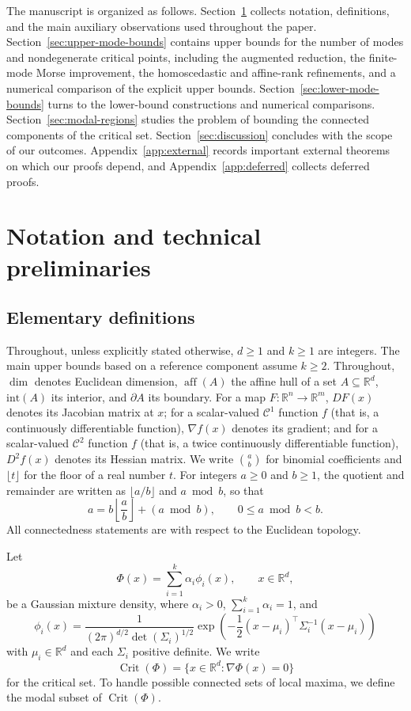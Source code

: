 \documentclass[11pt]{article}
\theoremstyle{plain}
\theoremstyle{definition}
\theoremstyle{remark}
\numberwithin{equation}{section}
\DeclareMathOperator{\aff}{aff}
\DeclareMathOperator{\Crit}{Crit}
\newcommand{\R}{\mathbb{R}}
\begin{document}
The manuscript is organized as follows. Section~\ref{sec:prelim} collects notation, definitions, and the main auxiliary observations used throughout the paper. Section~\ref{sec:upper-mode-bounds} contains upper bounds for the number of modes and nondegenerate critical points, including the augmented reduction, the finite-mode Morse improvement, the homoscedastic and affine-rank refinements, and a numerical comparison of the explicit upper bounds. Section~\ref{sec:lower-mode-bounds} turns to the lower-bound constructions and numerical comparisons. Section~\ref{sec:modal-regions} studies the problem of bounding the connected components of the critical set. Section~\ref{sec:discussion} concludes with the scope of our outcomes. Appendix~\ref{app:external} records important external theorems on which our proofs depend, and Appendix~\ref{app:deferred} collects deferred proofs.
\section{Notation and technical preliminaries}\label{sec:prelim}

\subsection{Elementary definitions}\label{subsec:definitions}

Throughout, unless explicitly stated otherwise, $d\ge1$ and $k\ge1$ are integers. The main upper bounds based on a reference component assume $k\ge2$. Throughout, $\dim$ denotes Euclidean dimension, $\aff(A)$ the affine hull of a set $A\subseteq\R^d$, $\mathrm{int}(A)$ its interior, and $\partial A$ its boundary. For a map $F:\R^n\to\R^m$, $DF(x)$ denotes its Jacobian matrix at $x$; for a scalar-valued $\mathcal{C}^1$ function $f$ (that is, a continuously differentiable function), $\nabla f(x)$ denotes its gradient; and for a scalar-valued $\mathcal{C}^2$ function $f$ (that is, a twice continuously differentiable function), $D^2f(x)$ denotes its Hessian matrix. We write $\binom{a}{b}$ for binomial coefficients and $\lfloor t\rfloor$ for the floor of a real number $t$. For integers $a\ge 0$ and $b\ge 1$, the quotient and remainder are written as $\lfloor a/b\rfloor$ and $a\bmod b$, so that
\[
a=b\left\lfloor\frac{a}{b}\right\rfloor +(a\bmod b),
\qquad
0\le a\bmod b<b.
\]
All connectedness statements are with respect to the Euclidean topology.

Let
\[
\Phi(x)=\sum_{i=1}^k \alpha_i\phi_i(x), \qquad x\in \R^d,
\]
be a Gaussian mixture density, where $\alpha_i>0$, $\sum_{i=1}^k \alpha_i=1$, and
\[
\phi_i(x)=\frac{1}{(2\pi)^{d/2}\det(\Sigma_i)^{1/2}}
\exp\!\left(-\frac12(x-\mu_i)^\top\Sigma_i^{-1}(x-\mu_i)\right)
\]
with $\mu_i\in\R^d$ and each $\Sigma_i$ positive definite. We write
\[
\Crit(\Phi)=\{x\in\R^d:\nabla \Phi(x)=0\}
\]
for the critical set. To handle possible connected sets of local maxima, we define the modal subset of $\Crit(\Phi)$.
\end{document}
